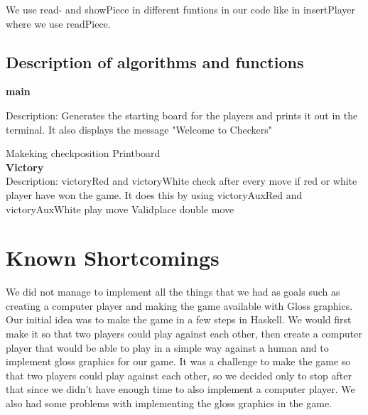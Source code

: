 \documentclass[12pt,a4paper]{article}
\begin{document}
We use read- and showPiece in different funtions in our code like in insertPlayer where we use readPiece.

\subsection{Description of algorithms and functions}
\textbf{\large {main}}

Description: Generates the starting board for the players and prints it out in the terminal.
It also displays the message "Welcome to Checkers"


Makeking
checkposition
Printboard\\

\textbf{\large {Victory}}\\
Description: victoryRed and victoryWhite check after every move if red or white player have won the game. It does this by using victoryAuxRed and victoryAuxWhite 
play move
Validplace
double move

\section{Known Shortcomings}
We did not manage to implement all the things that we had as goals such as creating a computer player and making the game available with Gloss graphics.
Our initial idea was to make the game in a few steps in Haskell. We would first make it so that two players could play against each other, then create a computer player that would be able to play in a simple way against a human and to implement gloss graphics for our game. It was a challenge to make the game so that two players could play against each other, so we decided only to stop after that since we didn’t have enough time to also implement a computer player. We also had some problems with implementing the gloss graphics in the game.
\end{document}

